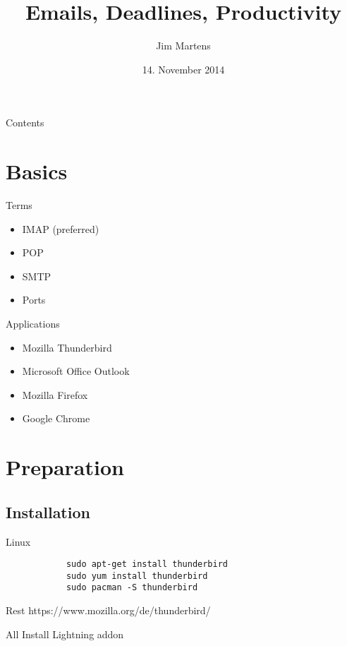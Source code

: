 \documentclass{beamer}
\begin{document}
\author{Jim Martens}
\title{Emails, Deadlines, Productivity}
\date{14. November 2014}

	\begin{frame}
		\titlepage
	\end{frame}
	
	\begin{frame}{Contents}
		\tableofcontents
	\end{frame}
	
	\section{Basics}
	\begin{frame}{Terms}
		\begin{itemize}
			\item IMAP (preferred)
			\item POP
			\item SMTP
			\item Ports
		\end{itemize}
	\end{frame}
	
	\begin{frame}{Applications}
		\begin{itemize}
			\item Mozilla Thunderbird
			\item Microsoft Office Outlook
			\item Mozilla Firefox
			\item Google Chrome
		\end{itemize}
	\end{frame}
	
	\section{Preparation}
	\subsection{Installation}
	\begin{frame}[fragile]{Linux}
		\begin{verbatim}
			sudo apt-get install thunderbird
			sudo yum install thunderbird
			sudo pacman -S thunderbird			
		\end{verbatim}
	\end{frame}
	\begin{frame}{Rest}
		https://www.mozilla.org/de/thunderbird/
	\end{frame}
	\begin{frame}{All}
		Install Lightning addon
	\end{frame}
	
\end{document}
